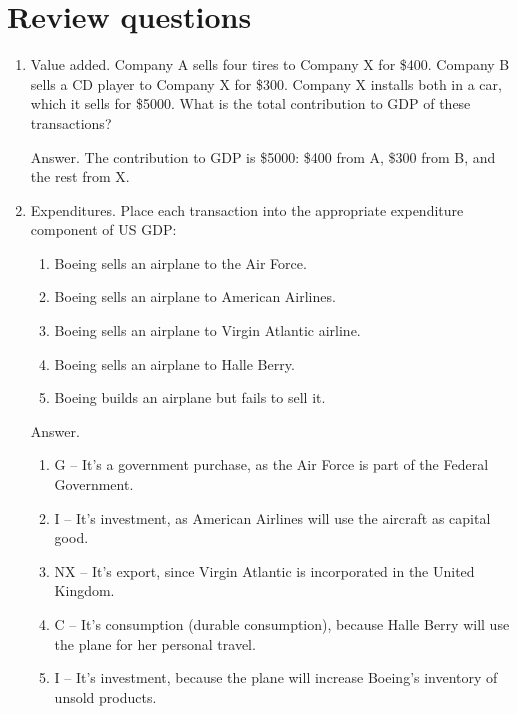 \section*{Review questions}

\setlength{\leftmargini}{.5\oldleftmargini}
\begin{enumerate}

\item Value added.  Company A sells four tires to Company X for \$400.
Company B sells a CD player to Company X for \$300.
Company X installs both in a car, which it sells for \$5000.
What is the total contribution to GDP of these transactions?

Answer.  The contribution to GDP is \$5000: \$400 from A, \$300 from B,
and the rest from X.

\item Expenditures.
Place each transaction into the appropriate expenditure component of US GDP:%
%
\begin{enumerate}
\item Boeing sells an airplane to the Air Force.%
\item Boeing sells an airplane to American Airlines.%
\item Boeing sells an airplane to Virgin Atlantic airline.%
\item Boeing sells an airplane to Halle Berry.%
\item Boeing builds an airplane but fails to sell it.%
\end{enumerate}

Answer.
%
\begin{enumerate}
\item G -- It's a government purchase, as the Air Force is part of the Federal Government.%
\item I -- It's investment, as American Airlines will use the aircraft as capital good.%
\item NX -- It's export, since Virgin Atlantic is incorporated in the United Kingdom.%
\item C -- It's consumption (durable consumption), because Halle Berry will use the plane for her personal travel.%
\item I -- It's investment, because the plane will increase Boeing's inventory of unsold products.%
\end{enumerate}



\end{enumerate}
